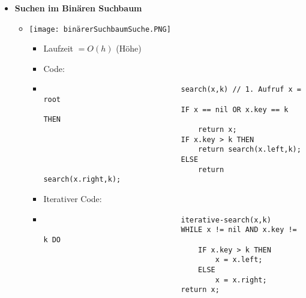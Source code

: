 \begin{itemize}
        \item \textbf{Suchen im Binären Suchbaum}
            \begin{itemize}
                \item[]
                    \begin{minipage}{0.4\textwidth}
                        \texttt{[image: binärerSuchbaumSuche.PNG]}
                    \end{minipage}
                    \begin{minipage}{0.5\textwidth}
                        \begin{itemize}
                            \item Laufzeit $= O(h)$ (Höhe)
                            \item Code:
                            \item[]
                                \begin{verbatim}
                                search(x,k) // 1. Aufruf x = root
                                IF x == nil OR x.key == k THEN
                                    return x;
                                IF x.key > k THEN
                                    return search(x.left,k);
                                ELSE
                                    return search(x.right,k);
                                \end{verbatim}
                            \item Iterativer Code:
                            \item[]
                                \begin{verbatim}
                                iterative-search(x,k)
                                WHILE x != nil AND x.key != k DO
                                    IF x.key > k THEN
                                        x = x.left;
                                    ELSE
                                        x = x.right;
                                return x;
                                \end{verbatim}
                        \end{itemize}
                    \end{minipage}
            \end{itemize}


\end{itemize}
